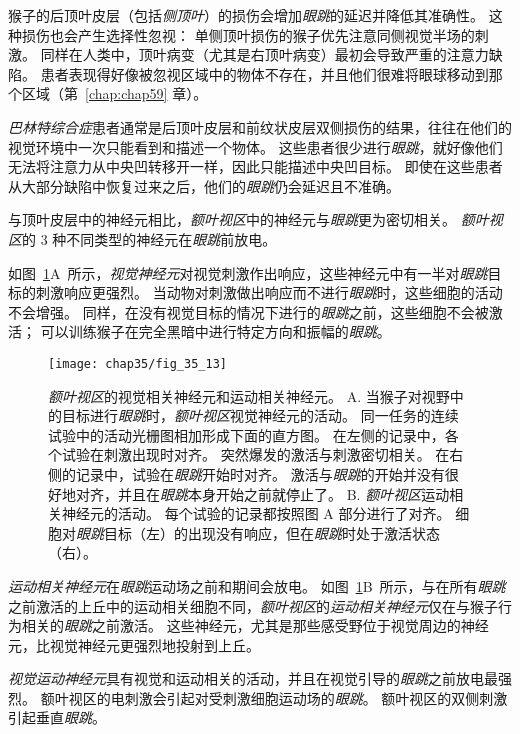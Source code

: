 猴子的后顶叶皮层（包括\textit{侧顶叶}）的损伤会增加\textit{眼跳}的延迟并降低其准确性。
这种损伤也会产生选择性忽视：
单侧顶叶损伤的猴子优先注意同侧视觉半场的刺激。
同样在人类中，顶叶病变（尤其是右顶叶病变）最初会导致严重的注意力缺陷。
患者表现得好像被忽视区域中的物体不存在，并且他们很难将眼球移动到那个区域（第~\ref{chap:chap59} 章）。


\textit{巴林特综合症}患者通常是后顶叶皮层和前纹状皮层双侧损伤的结果，往往在他们的视觉环境中一次只能看到和描述一个物体。
这些患者很少进行\textit{眼跳}，就好像他们无法将注意力从中央凹转移开一样，因此只能描述中央凹目标。
即使在这些患者从大部分缺陷中恢复过来之后，他们的\textit{眼跳}仍会延迟且不准确。


与顶叶皮层中的神经元相比，\textit{额叶视区}中的神经元与\textit{眼跳}更为密切相关。
\textit{额叶视区}的 3 种不同类型的神经元在\textit{眼跳}前放电。


如图~\ref{fig:35_13}A~所示，\textit{视觉神经元}对视觉刺激作出响应，这些神经元中有一半对\textit{眼跳}目标的刺激响应更强烈。
当动物对刺激做出响应而不进行\textit{眼跳}时，这些细胞的活动不会增强。
同样，在没有视觉目标的情况下进行的\textit{眼跳}之前，这些细胞不会被激活；
可以训练猴子在完全黑暗中进行特定方向和振幅的\textit{眼跳}。


\begin{figure}[htbp]
	\centering
	\texttt{[image: chap35/fig\_35\_13]}
	\caption{\textit{额叶视区}的视觉相关神经元和运动相关神经元\cite{bruce1985primate}。
		A. 当猴子对视野中的目标进行\textit{眼跳}时，\textit{额叶视区}视觉神经元的活动。
		同一任务的连续试验中的活动光栅图相加形成下面的直方图。
		在左侧的记录中，各个试验在刺激出现时对齐。
		突然爆发的激活与刺激密切相关。
		在右侧的记录中，试验在\textit{眼跳}开始时对齐。
		激活与\textit{眼跳}的开始并没有很好地对齐，并且在\textit{眼跳}本身开始之前就停止了。
		B. \textit{额叶视区}运动相关神经元的活动。
		每个试验的记录都按照图 A 部分进行了对齐。
		细胞对\textit{眼跳}目标（左）的出现没有响应，但在\textit{眼跳}时处于激活状态（右）。}
	\label{fig:35_13}
\end{figure}


\textit{运动相关神经元}在\textit{眼跳}运动场之前和期间会放电。
如图~\ref{fig:35_13}B~所示，与在所有\textit{眼跳}之前激活的上丘中的运动相关细胞不同，\textit{额叶视区}的\textit{运动相关神经元}仅在与猴子行为相关的\textit{眼跳}之前激活。
这些神经元，尤其是那些感受野位于视觉周边的神经元，比视觉神经元更强烈地投射到上丘。


\textit{视觉运动神经元}具有视觉和运动相关的活动，并且在视觉引导的\textit{眼跳}之前放电最强烈。
额叶视区的电刺激会引起对受刺激细胞运动场的\textit{眼跳}。
额叶视区的双侧刺激引起垂直\textit{眼跳}。


